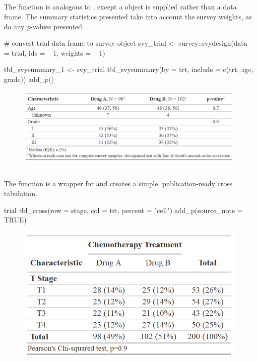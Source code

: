 \subsection{\texorpdfstring{}{tbl\_svysummary()}}

The  function is analogous to , except a  \citep{survey} object is supplied rather than a data frame.
The summary statistics presented take into account the survey weights, as do any \emph{p}-values presented.

\begin{example}
# convert trial data frame to survey object
svy_trial <- survey::svydesign(data = trial, ids = ~ 1, weights = ~ 1)

tbl_svysummary_1 <-
  svy_trial %
  tbl_svysummary(by = trt, include = c(trt, age, grade)) %
  add_p()
\end{example}
\begin{figure}[h!]
  \includegraphics[scale=0.73]{svysummary.png}
  \centering
\end{figure}

\subsection{\texorpdfstring{}{tbl\_cross()}}

The  function is a wrapper for  and creates a simple, publication-ready cross tabulation.

\newpage
\begin{example}
trial %
  tbl_cross(row = stage, col = trt, percent = "cell") %
  add_p(source_note = TRUE)
\end{example}
\begin{figure}[h!]
  \includegraphics[scale=0.73]{cross.png}
  \centering
\end{figure}


